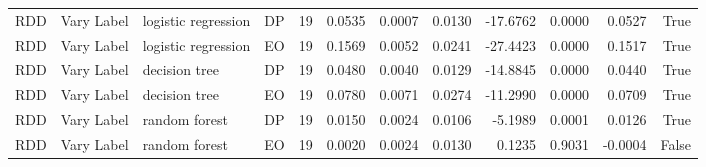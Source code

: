 \begin{table}
\begin{tabular}{llllrrrrrrrr}
RDD & Vary Label & logistic regression & DP & 19 & 0.0535 & 0.0007 & 0.0130 & -17.6762 & 0.0000 & 0.0527 & True \\
RDD & Vary Label & logistic regression & EO & 19 & 0.1569 & 0.0052 & 0.0241 & -27.4423 & 0.0000 & 0.1517 & True \\
RDD & Vary Label & decision tree & DP & 19 & 0.0480 & 0.0040 & 0.0129 & -14.8845 & 0.0000 & 0.0440 & True \\
RDD & Vary Label & decision tree & EO & 19 & 0.0780 & 0.0071 & 0.0274 & -11.2990 & 0.0000 & 0.0709 & True \\
RDD & Vary Label & random forest & DP & 19 & 0.0150 & 0.0024 & 0.0106 & -5.1989 & 0.0001 & 0.0126 & True \\
RDD & Vary Label & random forest & EO & 19 & 0.0020 & 0.0024 & 0.0130 & 0.1235 & 0.9031 & -0.0004 & False \\
\bottomrule
\end{tabular}
\end{table}
